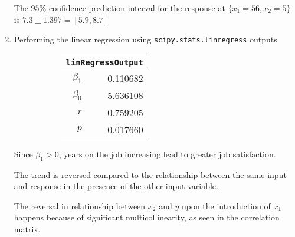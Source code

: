 \begin{enumerate}
\begin{figure}[H]
\end{figure}

The $ 95\% $ confidence prediction interval for the response at $ \{x_1 = 56, x_2 = 5\} $ is
$ 7.3 \pm 1.397 = [5.9, 8.7]$ \\

\item Performing the linear regression using \texttt{scipy.stats.linregress} outputs \\

\begin{figure}[H]
	\begin{subfigure}[]{0.2\linewidth}
		\centering
		\begin{tabular}{@{}rr@{}}
			\toprule
			\multicolumn{2}{c}{\texttt{linRegressOutput}} \\
			\midrule
			$\beta_1$     &         0.110682 \\
			$\beta_0$ &         5.636108 \\
			$r$    &         0.759205 \\
			$p$    &         0.017660 \\
			\bottomrule
		\end{tabular}
		
	\end{subfigure}
	\begin{subfigure}[]{0.8\linewidth}
		\centering
		
	\end{subfigure}
\end{figure}

Since $ \beta_1  > 0$, years on the job increasing lead to greater job satisfaction.

The trend is reversed compared to the relationship between the same input and response in the presence of the other input variable.

The reversal in relationship between $ x_2 $ and $ y $ upon the introduction of $ x_1 $ happens because of significant multicollinearity, as seen in the correlation matrix.


\end{enumerate}

